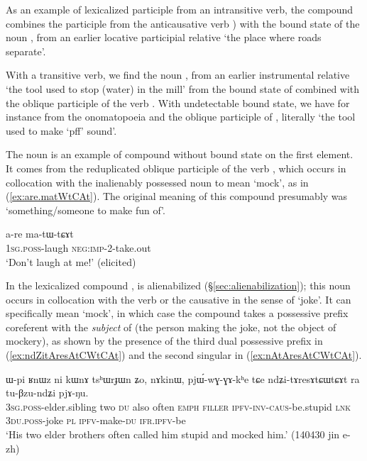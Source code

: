 As an example of lexicalized participle from an intransitive verb, the compound  combines the participle  from the anticausative verb ) with the bound state of the noun , from an earlier locative participial relative  `the place where roads separate'. 

With a transitive verb, we find the noun , from an earlier instrumental relative  `the tool used to stop (water) in the mill' from the bound state  of  combined with the oblique participle  of the verb . With undetectable bound state, we have for instance  from the  onomatopoeia  and the oblique participle of , literally `the tool used to make `pff' sound'. 

The noun  is an example of compound without bound state on the first element. It comes from the reduplicated oblique participle of the verb , which occurs in collocation with the inalienably possessed noun  to mean `mock', as in (\ref{ex:are.matWtCAt}). The original meaning of this compound presumably was `something/someone to make fun of'.

\begin{exe}
\ex \label{ex:are.matWtCAt}
\gll a-re ma-tɯ-tɕɤt \\
\textsc{1sg}.\textsc{poss}-laugh \textsc{neg}:\textsc{imp}-2-take.out \\
\glt `Don't laugh at me!' (elicited)
\end{exe}

In the lexicalized compound ,  is alienabilized (§\ref{sec:alienabilization}); this noun occurs in collocation with the verb  or the causative  in the sense of `joke'. It can specifically mean `mock', in which case the compound  takes a possessive prefix coreferent with the \textit{subject} of  (the person making the joke, not the object of mockery), as shown by the presence of the third dual possessive prefix  in (\ref{ex:ndZitAresAtCWtCAt}) and the second singular  in (\ref{ex:nAtAresAtCWtCAt}).

\begin{exe}
\ex \label{ex:ndZitAresAtCWtCAt}
\gll ɯ-pi ʁnɯz ni kɯnɤ tsʰɯrɟɯn ʑo, nɤkinɯ, pjɯ́-wɣ-ɣɤ-kʰe tɕe ndʑi-tɤresɤtɕɯtɕɤt ra tu-βzu-ndʑi pjɤ-ŋu. \\
\textsc{3sg}.\textsc{poss}-elder.sibling two \textsc{du} also often \textsc{emph} \textsc{filler} \textsc{ipfv}-\textsc{inv}-\textsc{caus}-be.stupid \textsc{lnk} \textsc{3du}.\textsc{poss}-joke \textsc{pl} \textsc{ipfv}-make-\textsc{du} \textsc{ifr}.\textsc{ipfv}-be \\
\glt `His two elder brothers often called him stupid and mocked him.' (140430 jin e-zh)
\end{exe}

